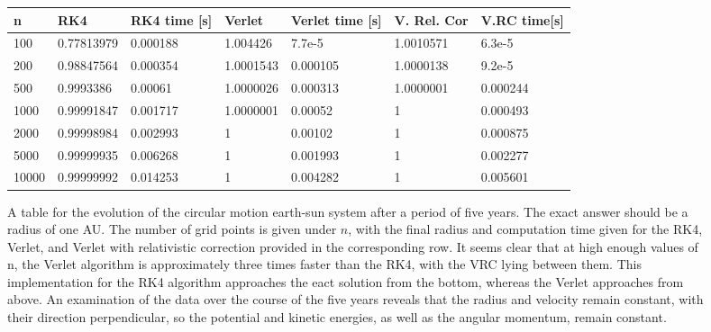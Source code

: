 \documentclass[11pt,a4paper]{article}
\begin{document}
\begin{figure}
\centering
\begin{tabular}{| l | l | l | l | l | l | l |}
\hline
n  	 & RK4 & RK4 time [s] & Verlet & Verlet time [s] & V. Rel. Cor & V.RC time[s]  \\ \hline
100   &  0.77813979  &  0.000188   &   1.004426   & 7.7e-5    & 1.0010571 & 6.3e-5 \\ \hline
200   &  0.98847564  &  0.000354   &  1.0001543   & 0.000105  & 1.0000138 & 9.2e-5 \\ \hline
500   &  0.9993386 	 &  0.00061    &  1.0000026   & 0.000313  & 1.0000001 & 0.000244 \\ \hline
1000   &  0.99991847 &  0.001717   &  1.0000001	  & 0.00052   & 1		  & 0.000493 \\ \hline
2000   &  0.99998984 &  0.002993   &   1	 	  & 0.00102   & 1		  & 0.000875 \\ \hline
5000   &  0.99999935 &  0.006268   &   1		  & 0.001993  & 1		  & 0.002277 \\ \hline
10000  &  0.99999992 &  0.014253   &   1		  & 0.004282  & 1		  & 0.005601 \\ \hline
\end{tabular}
\caption{A table for the evolution of the circular motion earth-sun system after a period of five years. The exact answer should be a radius of one AU. The number of grid points is given under $n$, with the final radius and computation time given for the RK4, Verlet, and Verlet with relativistic correction provided in the corresponding row. It seems clear that at high enough values of n, the Verlet algorithm is approximately three times faster than the RK4, with the VRC lying between them. This implementation for the RK4 algorithm approaches the eact solution from the bottom, whereas the Verlet approaches from above. An examination of the data over the course of the five years reveals that the radius and velocity remain constant, with their direction perpendicular, so the potential and kinetic energies, as well as the angular momentum, remain constant.}
\end{figure}
\end{document}
